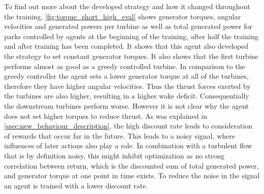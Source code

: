 To find out more about the developed strategy and how it changed throughout the training, \autoref{fig:torque_short_high_eval} shows generator torques, angular velocities and generated powers per turbine as well as total generated power for parks controlled by agents at the beginning of the training, after half the training and after training has been completed. It shows that this agent also developed the strategy to set constant generator torques.  It also  shows that the first turbine performs almost as good as a greedy controlled turbine. In comparison to the greedy controller the agent sets a lower generator torque at all of the turbines, therefore they have higher angular velocities. Thus the thrust forces exerted by the turbines are also higher, resulting in a higher wake deficit. Consequentially the downstream turbines perform worse. However it is not clear why the agent does not set higher torques to reduce thrust. As was explained in \autoref{ssec:new_behaviour_description}, the high discount rate leads to consideration of rewards that occur far in the future. This leads to a noisy signal, where influences of later actions also play a role. In combination with a turbulent flow that is by definition noisy, this might inhibit optimization as no strong correlation between return, which is the discounted sum of total generated power, and generator torque at one point in time exists. To reduce the noise in the signal an agent is trained with a lower discount rate.
